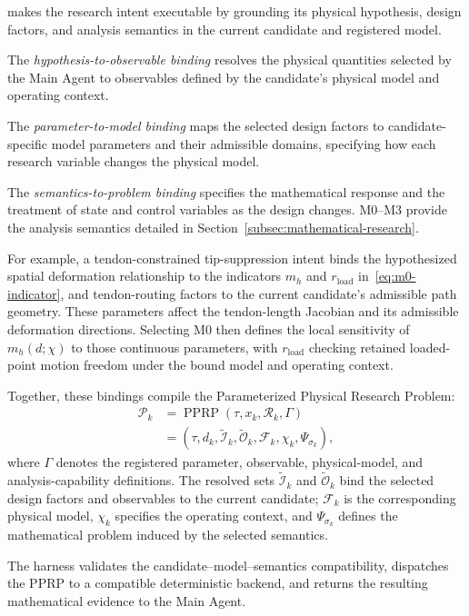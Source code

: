 \PPRP{} makes the research intent executable by grounding its physical hypothesis, design factors, and analysis semantics in the current candidate and registered model.

The \emph{hypothesis-to-observable binding} resolves the physical quantities selected by the Main Agent to observables defined by the candidate's physical model and operating context.

The \emph{parameter-to-model binding} maps the selected design factors to candidate-specific model parameters and their admissible domains, specifying how each research variable changes the physical model.

The \emph{semantics-to-problem binding} specifies the mathematical response and the treatment of state and control variables as the design changes. M0--M3 provide the analysis semantics detailed in Section~\ref{subsec:mathematical-research}.

For example, a tendon-constrained tip-suppression intent binds the hypothesized spatial deformation relationship to the indicators $m_h$ and $r_{\mathrm{load}}$ in~\eqref{eq:m0-indicator}, and tendon-routing factors to the current candidate's admissible path geometry. These parameters affect the tendon-length Jacobian and its admissible deformation directions. Selecting M0 then defines the local sensitivity of $m_h(d;\chi)$ to those continuous parameters, with $r_{\mathrm{load}}$ checking retained loaded-point motion freedom under the bound model and operating context.

Together, these bindings compile the Parameterized Physical Research Problem:
\begin{equation}
\begin{aligned}
\mathcal P_k
&=\operatorname{PPRP}(\tau,x_k,\mathcal R_k,\Gamma)\\
&=(\tau,d_k,\tilde{\mathcal I}_k,\tilde{\mathcal O}_k,\mathcal F_k,\chi_k,\Psi_{\sigma_k}),
\end{aligned}
\label{eq:pprp}
\end{equation}
where $\Gamma$ denotes the registered parameter, observable, physical-model, and analysis-capability definitions. The resolved sets $\tilde{\mathcal I}_k$ and $\tilde{\mathcal O}_k$ bind the selected design factors and observables to the current candidate; $\mathcal F_k$ is the corresponding physical model, $\chi_k$ specifies the operating context, and $\Psi_{\sigma_k}$ defines the mathematical problem induced by the selected semantics.

The harness validates the candidate--model--semantics compatibility, dispatches the PPRP to a compatible deterministic backend, and returns the resulting mathematical evidence to the Main Agent.

